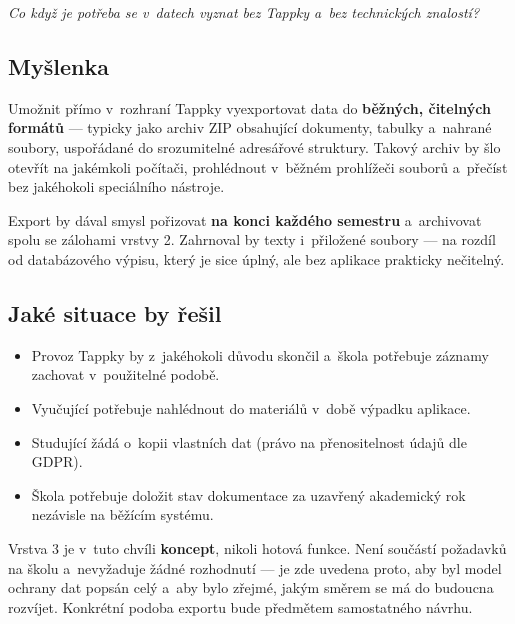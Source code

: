 \documentclass[11pt,a4paper]{article}
\begin{document}
\begin{center}
\emph{Co když je potřeba se v~datech vyznat bez Tappky a~bez technických znalostí?}
\end{center}

\subsection{Myšlenka}

Umožnit přímo v~rozhraní Tappky vyexportovat data do \textbf{běžných, čitelných formátů} ---
typicky jako archiv ZIP obsahující dokumenty, tabulky a~nahrané soubory, uspořádané do
srozumitelné adresářové struktury. Takový archiv by šlo otevřít na jakémkoli počítači, prohlédnout
v~běžném prohlížeči souborů a~přečíst bez jakéhokoli speciálního nástroje.

Export by dával smysl pořizovat \textbf{na konci každého semestru} a~archivovat spolu se zálohami
vrstvy 2. Zahrnoval by texty i~přiložené soubory --- na rozdíl od databázového výpisu, který je
sice úplný, ale bez aplikace prakticky nečitelný.

\subsection{Jaké situace by řešil}

\begin{itemize}
  \item Provoz Tappky by z~jakéhokoli důvodu skončil a~škola potřebuje záznamy zachovat
        v~použitelné podobě.
  \item Vyučující potřebuje nahlédnout do materiálů v~době výpadku aplikace.
  \item Studující žádá o~kopii vlastních dat (právo na přenositelnost údajů dle GDPR).
  \item Škola potřebuje doložit stav dokumentace za uzavřený akademický rok nezávisle na
        běžícím systému.
\end{itemize}

\begin{informace}[Stav]
Vrstva 3 je v~tuto chvíli \textbf{koncept}, nikoli hotová funkce. Není součástí požadavků na
školu a~nevyžaduje žádné rozhodnutí --- je zde uvedena proto, aby byl model ochrany dat popsán
celý a~aby bylo zřejmé, jakým směrem se má do budoucna rozvíjet. Konkrétní podoba exportu bude
předmětem samostatného návrhu.
\end{informace}

\newpage
\end{document}
